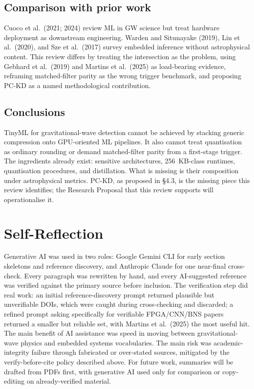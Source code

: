\documentclass[11pt,a4paper]{article}
\begin{document}
\subsection{Comparison with prior work}
Cuoco et al.\ (2021; 2024) review ML in GW science but treat hardware deployment as downstream engineering. Warden and Situnayake (2019), Lin et al.\ (2020), and Sze et al.\ (2017) survey embedded inference without astrophysical content. This review differs by treating the intersection as the problem, using Gebhard et al.\ (2019) and Martins et al.\ (2025) as load-bearing evidence, reframing matched-filter parity as the wrong trigger benchmark, and proposing PC-KD as a named methodological contribution.

\subsection{Conclusions}
TinyML for gravitational-wave detection cannot be achieved by stacking generic compression onto GPU-oriented ML pipelines. It also cannot treat quantisation as ordinary rounding or demand matched-filter parity from a first-stage trigger. The ingredients already exist: sensitive architectures, 256~KB-class runtimes, quantisation procedures, and distillation. What is missing is their composition under astrophysical metrics. PC-KD, as proposed in \S4.3, is the missing piece this review identifies; the Research Proposal that this review supports will operationalise it.

\section{Self-Reflection}
Generative AI was used in two roles: Google Gemini CLI for early section skeletons and reference discovery, and Anthropic Claude for one near-final cross-check. Every paragraph was rewritten by hand, and every AI-suggested reference was verified against the primary source before inclusion. The verification step did real work: an initial reference-discovery prompt returned plausible but unverifiable DOIs, which were caught during cross-checking and discarded; a refined prompt asking specifically for verifiable FPGA/CNN/BNS papers returned a smaller but reliable set, with Martins et al.\ (2025) the most useful hit. The main benefit of AI assistance was speed in moving between gravitational-wave physics and embedded systems vocabularies. The main risk was academic-integrity failure through fabricated or over-stated sources, mitigated by the verify-before-cite policy described above. For future work, summaries will be drafted from PDFs first, with generative AI used only for comparison or copy-editing on already-verified material.
\end{document}
